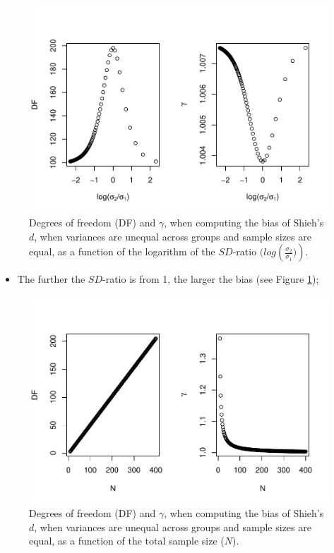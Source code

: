 \documentclass[
  english,
  man,mask]{apa6}
\providecommand{\tightlist}{%
  \setlength{\itemsep}{0pt}\setlength{\parskip}{0pt}}
\begin{document}
\begin{figure}
\centering
\includegraphics{Theoretical-Bias-of-all-estimators-as-a-function-of-population-parameters_files/figure-latex/biasshiehhetbalSDratio2-1.pdf}
\caption{\label{fig:biasshiehhetbalSDratio2}Degrees of freedom (DF) and \(\gamma\), when computing the bias of Shieh's \(d\), when variances are unequal across groups and sample sizes are equal, as a function of the logarithm of the \(SD\)-ratio \((log \left(\frac{\sigma_2}{\sigma_1})\right)\).}
\end{figure}

\begin{itemize}
\tightlist
\item
  The further the \(SD\)-ratio is from 1, the larger the bias (see Figure \ref{fig:biasshiehhetbalSDratio2});
\end{itemize}

\begin{figure}
\centering
\includegraphics{Theoretical-Bias-of-all-estimators-as-a-function-of-population-parameters_files/figure-latex/biasshiehhetbalNsize2-1.pdf}
\caption{\label{fig:biasshiehhetbalNsize2}Degrees of freedom (DF) and \(\gamma\), when computing the bias of Shieh's \(d\), when variances are unequal across groups and sample sizes are equal, as a function of the total sample size (\(N\)).}
\end{figure}
\end{document}
